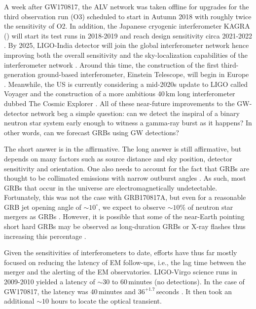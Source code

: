 \documentclass[prd,amsmath,amssymb,aps,floats,amsfonts,notitlepage,superscriptaddress,eqsecnum,nofootinbib,10pt]{revtex4-1}
\begin{document}
A week after GW170817, the ALV network was taken offline for upgrades for the third observation run (O3) 
scheduled to start in Autumn 2018 with roughly twice the sensitivity of O2.
In addition, the Japanese cryogenic interferometer KAGRA (\cite{KAGRA, KAGRA2}) will start its test runs in 2018-2019 and reach design sensitivity circa 2021-2022 \cite{Akutsu:2017thy, Aasi:2013wya}. By 2025, LIGO-India detector will join the global interferometer network hence improving both the overall sensitivity and the sky-localization capabilities of the interferometer network \cite{Aasi:2013wya}.
Around this time, the construction of the first third-generation ground-based interferometer, Einstein Telescope, will begin in Europe \cite{ET_doc}. 
Meanwhile, the US is currently considering a mid-2020s update to LIGO called Voyager \cite{LIGO_Voy} and the construction of a more ambitious 40\,km long interferometer dubbed The Cosmic Explorer \cite{CE}.
All of these near-future improvements to the GW-detector network beg a simple question: can we detect the inspiral of a binary neutron star system
early enough to witness a gamma-ray burst as it happens? In other words, can we forecast GRBs using GW detections?

The short answer is in the affirmative. The long answer is still affirmative, but depends on many factors such as source distance and sky position, detector sensitivity and orientation. One also needs to account for the fact that GRBs are thought to be collimated emissions with narrow outburst angles \cite{Kumar:2014upa}.
As such, most GRBs that occur in the universe are electromagnetically undetectable. Fortunately, this was not the case with GRB170817A, 
but even for a reasonable GRB jet opening angle of $\sim 10^\circ$, we expect to observe $\sim 10\%$ of neutron star mergers as GRBs \cite{Patricelli:2016bkt}. 
However, it is possible that some of the near-Earth pointing short hard GRBs may be observed as long-duration GRBs or X-ray flashes thus increasing this percentage \cite{Bucciantini:2011kx}.

Given the sensitivities of interferometers to date, efforts have thus far mostly focused on reducing the latency of EM follow-ups, 
i.e., the lag time between the merger and the alerting of the EM observatories. 
LIGO-Virgo science runs in 2009-2010 yielded a latency of $\sim 30$ to $60\,$minutes \cite{Abbott:2011ys} (no detections).
In the case of GW170817, the latency was 40\,minutes and $36^{+1.7}\,$seconds \cite{GBM:2017lvd}.
It then took an additional $\sim 10$ hours to locate the optical transient. %
\end{document}
